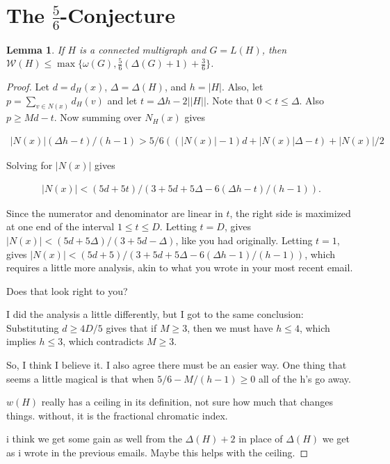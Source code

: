 \documentclass[12pt]{amsart}
\theoremstyle{plain}
\newtheorem{lem}[thm]{Lemma}
\theoremstyle{definition}
\theoremstyle{remark}
\newcommand{\fancy}[1]{\mathcal{#1}}
\newcommand{\W}{\fancy{W}}
\begin{document}
\newpage

\section{The $\frac56$-Conjecture}
\begin{lem}
If $H$ is a connected multigraph and $G = L(H)$, then $\W(H) \le
\max\{\omega(G), \frac56(\Delta(G) + 1) + \frac36\}$.
\end{lem}
\begin{proof}
Let $d = d_H(x)$,  $\Delta = \Delta(H)$, and $h = |H|$. 
Also, let $p = \sum_{v \in N(x)} d_H(v)$ and
let $t = \Delta h-2||H||$.
Note that $0 < t \le \Delta$.  Also $p \ge Md - t$.  Now summing over $N_H(x)$
gives

\begin{align*}
|N(x)|(\Delta h-t)/(h-1) > 5/6((|N(x)|-1)d + |N(x)|\Delta - t) + |N(x)|/2
\end{align*}

Solving for $|N(x)|$ gives

\begin{align*}
|N(x)| < (5d+5t)/(3+5d+5\Delta-6(\Delta h-t)/(h-1)).
\end{align*}

Since the numerator and denominator are linear in $t$, the right side is
maximized at one end of the interval $1 \le t \le D$.  Letting $t = D$,
gives $|N(x)| < (5d+5\Delta)/(3+5d-\Delta)$, like you had originally.  Letting $t = 1$,
gives $|N(x)| < (5d+5)/(3+5d+5\Delta-6(\Delta h-1)/(h-1))$, which requires a little more
analysis, akin to what you wrote in your most recent email.

Does that look right to you?



I did the analysis a little differently, but I got to the same
conclusion: Substituting $d \ge 4D/5$ gives that if $M \ge 3$, then we
must have $h \le 4$, which implies $h \le 3$, which contradicts $M \ge 3$.

So, I think I believe it.  I also agree there must be an easier way.
One thing that seems a little magical is that when $5/6 - M/(h-1) \ge 0$
all of the h's go away.

$w(H)$ really has a ceiling in its definition, not sure how much that changes
things.   without, it is the fractional chromatic index.

i think we get some gain as well from the $\Delta(H) + 2$ in place of $\Delta(H)$
we get as i wrote in the previous emails.   Maybe this helps with the ceiling.


\end{proof}
\end{document}
